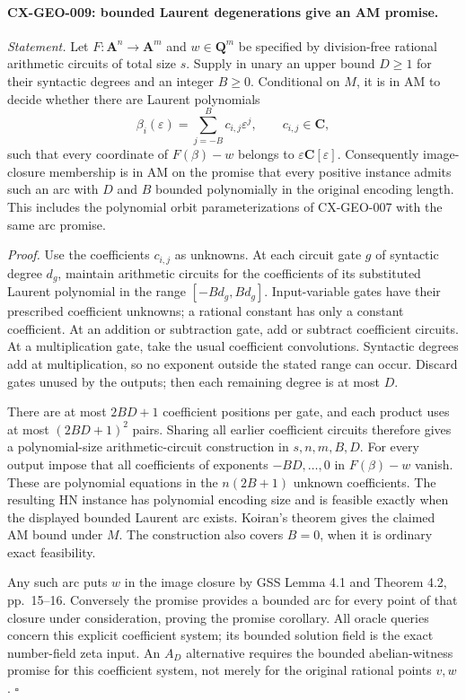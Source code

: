 \paragraph{CX-GEO-009: bounded Laurent degenerations give an AM promise.}
\emph{Statement.} Let $F:\mathbf A^n\to\mathbf A^m$ and
$w\in\mathbf Q^m$ be specified by division-free rational arithmetic
circuits of total size $s$. Supply in unary an upper bound $D\ge1$ for
their syntactic degrees and an integer $B\ge0$.
Conditional on $M$, it is in $\mathrm{AM}$ to decide whether there are
Laurent polynomials
\[
 \beta_i(\varepsilon)=\sum_{j=-B}^{B}c_{i,j}\varepsilon^j,
 \qquad c_{i,j}\in\mathbf C,
\]
such that every coordinate of $F(\beta)-w$ belongs to
$\varepsilon\mathbf C[\varepsilon]$.
Consequently image-closure membership is in $\mathrm{AM}$ on the promise
that every positive instance admits such an arc with $D$ and $B$ bounded
polynomially in the original encoding length. This includes the polynomial
orbit parameterizations of CX-GEO-007 with the same arc promise.

\emph{Proof.} Use the coefficients $c_{i,j}$ as unknowns. At each circuit
gate $g$ of syntactic degree $d_g$, maintain arithmetic circuits for the
coefficients of its substituted Laurent polynomial in the range
$[-Bd_g,Bd_g]$. Input-variable gates have their prescribed coefficient
unknowns; a rational constant has only a constant coefficient. At an
addition or subtraction gate, add or subtract coefficient circuits.
At a multiplication gate, take the usual coefficient convolutions.
Syntactic degrees add at multiplication, so no exponent outside the stated
range can occur. Discard gates unused by the outputs; then each remaining
degree is at most $D$.

There are at most $2BD+1$ coefficient positions per gate, and each product
uses at most $(2BD+1)^2$ pairs. Sharing all earlier coefficient circuits
therefore gives a polynomial-size arithmetic-circuit construction in
$s,n,m,B,D$. For every output impose that all coefficients of exponents
$-BD,\ldots,0$ in $F(\beta)-w$ vanish. These are polynomial equations in
the $n(2B+1)$ unknown coefficients. The resulting HN instance has polynomial
encoding size and is feasible exactly when the displayed bounded Laurent
arc exists. Koiran's theorem gives the claimed AM bound under $M$.
The construction also covers $B=0$, when it is ordinary exact feasibility.

Any such arc puts $w$ in the image closure by GSS Lemma 4.1 and Theorem
4.2, pp.~15--16. Conversely the promise provides a bounded arc for every
point of that closure under consideration, proving the promise corollary.
All oracle queries concern this explicit coefficient system; its bounded
solution field is the exact number-field zeta input. An $A_D$ alternative
requires the bounded abelian-witness promise for this coefficient system,
not merely for the original rational points $v,w$.
\hfill$\square$

